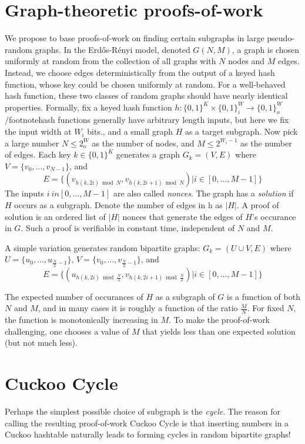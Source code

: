 \documentclass[11pt, oneside]{article}
\begin{document}
\section{Graph-theoretic proofs-of-work}
We propose to base proofs-of-work on finding certain subgraphs in large pseudo-random graphs.
In the Erd\H{o}s-R\'{e}nyi model, denoted $G(N,M)$, a graph is chosen uniformly at random
from the collection of all graphs with $N$ nodes and $M$ edges. Instead, we choose edges
deterministically from the output of a keyed hash function, whose key could be chosen
uniformly at random. For a well-behaved hash function, these two classes of random graphs
should have nearly identical  properties.
Formally, fix a keyed hash function
$h: \{0,1\}^K \times \{0,1\}^W_i \rightarrow \{0,1\}^W_o$/footnote{hash functions generally
have arbitrary length inputs, but here we fix the input width at $W_i$ bits.},
and a small graph $H$ as a target subgraph.
Now pick a large number $N \leq 2^W_o$ as the number of nodes,
and $M \leq 2^{W_i-1}$ as the number of edges.
Each key $k \in \{0,1\}^K$ generates a graph $G_k = (V,E)$ where $V=\{v_0,\ldots,v_{N-1}\}$, and
\begin{equation}
E=\{(v_{h(k,2i) \bmod N},v_{h(k,2i+1) \bmod N}) | i \in [0,\ldots,M-1]\}
\end{equation}
The inputs $i\ in [0,\ldots,M-1]$ are also called {\em nonces}.
The graph has a {\em solution} if $H$ occurs as a subgraph.
Denote the number of edges in h as $|H|$.
A proof of solution is an ordered list of $|H|$ nonces that generate the edges
of $H$'s occurance in $G$.
Such a proof is verifiable in constant time, independent of $N$ and $M$.

A simple variation generates random bipartite graphs:
$G_k = (U \cup V,E)$ where $U=\{u_0,\ldots,u_{\frac{N}{2}-1}\}$, $V=\{v_0,\ldots,v_{\frac{N}{2}-1}\}$,
and
\begin{equation}
E=\{(u_{h(k,2i) \bmod \frac{N}{2}}, v_{h(k,2i+1) \bmod \frac{N}{2}}) | i \in [0,\ldots,M-1]\}
\end{equation}


The expected number of occurances of $H$ as a subgraph of $G$ is a function of both $N$ and $M$,
and in many cases it is roughly a function of the ratio $\frac{M}{N}$.
For fixed $N$, the function is monotonically increasing in $M$.
To make the proof-of-work challenging, one chooses a value of $M$ that yields less than one
expected solution (but not much less).

\section{Cuckoo Cycle}
Perhaps the simplest possible choice of subgraph is the {\em cycle}.
The reason for calling the resulting proof-of-work Cuckoo Cycle is that
inserting numbers in a Cuckoo hashtable naturally leads to forming cycles
in random bipartite graphs!
\end{document}
